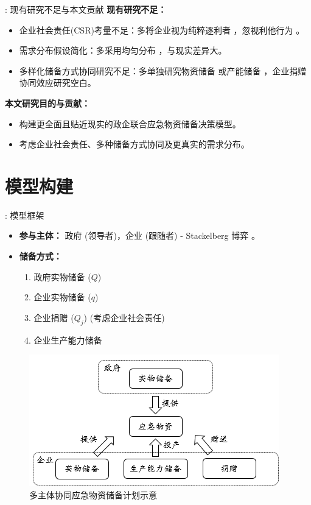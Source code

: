 \documentclass[9pt]{beamer}
\begin{document}
\begin{frame}{\insertsectionhead: 现有研究不足与本文贡献}
    \textbf{现有研究不足：}
    \begin{itemize}
        \item 企业社会责任(CSR)考量不足：多将企业视为纯粹逐利者 \cite{Li2022Stackelberg, Chen2023Contract}，忽视利他行为 \cite{zhengh2023}。
        \item 需求分布假设简化：多采用均匀分布 \cite{chai2021考虑储备周期, chen2014突发事件灾前应急物资政企联合储备模式}，与现实差异大。
        \item 多样化储备方式协同研究不足：多单独研究物资储备 \cite{Li2022Stackelberg, li2022政企联合储备, Chen2023Contract} 或产能储备 \cite{Gong2024Quantity}，企业捐赠协同效应研究空白。
    \end{itemize}
    \textbf{本文研究目的与贡献：}
    \begin{itemize}
        \item 构建更全面且贴近现实的政企联合应急物资储备决策模型。
        \item 考虑企业社会责任、多种储备方式协同及更真实的需求分布。
    \end{itemize}
\end{frame}

\section{模型构建}
\begin{frame}{\insertsectionhead: 模型框架}
    \begin{itemize}
        \item \textbf{参与主体：} 政府 (领导者)，企业 (跟随者) - Stackelberg 博弈 \cite{Li2022Stackelberg}。
        \item \textbf{储备方式：}
            \begin{enumerate}
                \item 政府实物储备 ($Q$)
                \item 企业实物储备 ($q$)
                \item 企业捐赠 ($Q_j$) (考虑企业社会责任)
                \item 企业生产能力储备
            \end{enumerate}
    \end{itemize}
    \begin{figure}
        \centering
        \includegraphics[width=0.6\linewidth]{basic_pictures/结构图.png}
        \caption{多主体协同应急物资储备计划示意}
    \end{figure}
\end{frame}
\end{document}
